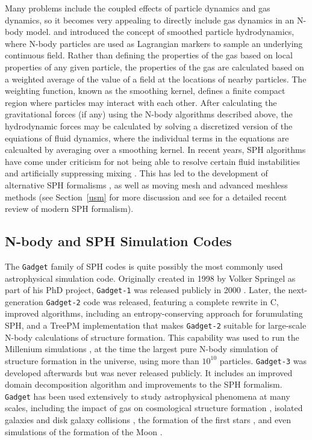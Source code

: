 \documentclass[11pt,twoside]{article}
\begin{document}
Many problems include the coupled effects of particle dynamics and gas dynamics, so it becomes very appealing to directly include gas dynamics in an N-body model. \citet{lucy1977} and \citet{gingold1977} introduced the concept of smoothed particle hydrodynamics, where N-body particles are used as Lagrangian markers to sample an underlying continuous field. Rather than defining the properties of the gas based on local properties of any given particle, the properties of the gas are calculated based on a weighted average of the value of a field at the locations of nearby particles. The weighting function, known as the smoothing kernel, defines a finite compact region where particles may interact with each other. After calculating the gravitational forces (if any) using the N-body algorithms described above, the hydrodynamic forces may be calculated by solving a discretized version of the equiations of fluid dynamics, where the individual terms in the equations are calcualted by averaging over a smoothing kernel. In recent years, SPH algorithms have come under criticism for not being able to resolve certain fluid instabilities \citep{agertz2007} and artificially suppressing mixing \citep{read2010}. This has led to the development of alternative SPH formalisms \citep{abel2011, hopkins2013}, as well as moving mesh and advanced meshless methods (see Section~\ref{usm} for more discussion and see \citet{price2012} for a detailed recent review of modern SPH formalism).

\subsection{N-body and SPH Simulation Codes}

The \texttt{Gadget} family of SPH codes is quite possibly the most commonly used astrophysical simulation code. Originally created in 1998 by Volker Springel as part of his PhD project, \texttt{Gadget-1} was released publicly in 2000 \citep{springel2001}. Later, the next-generation \texttt{Gadget-2} code was released, featuring a complete rewrite in C, improved algorithms, including an entropy-conserving approach for forumulating SPH, and a TreePM implementation \citep{springel2005b} that makes \texttt{Gadget-2} suitable for large-scale N-body calculations of structure formation. This capability was used to run the Millenium simulations \citep{springel2005a}, at the time the largest pure N-body simulation of structure formation in the universe, using more than $10^{10}$ particles. \texttt{Gadget-3} was developed afterwards but was never released publicly. It includes an improved domain decomposition algorithm and improvements to the SPH formalism. \texttt{Gadget} has been used extensively to study astrophysical phenomena at many scales, including the impact of gas on cosmological structure formation \citep{schaye2015}, isolated galaxies \citep{springel2005c} and disk galaxy collisions \citep{robertson2006}, the formation of the first stars \citep{clark2011}, and even simulations of the formation of the Moon \citep{jackson2012}.
\end{document}
